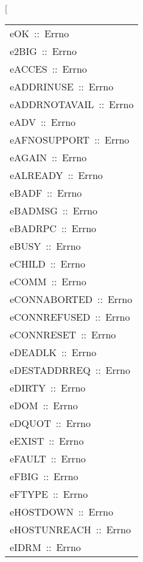\begin{haddockdesc}
\item[\begin{tabular}{@{}l}
eOK\ ::\ Errno\\e2BIG\ ::\ Errno\\eACCES\ ::\ Errno\\eADDRINUSE\ ::\ Errno\\eADDRNOTAVAIL\ ::\ Errno\\eADV\ ::\ Errno\\eAFNOSUPPORT\ ::\ Errno\\eAGAIN\ ::\ Errno\\eALREADY\ ::\ Errno\\eBADF\ ::\ Errno\\eBADMSG\ ::\ Errno\\eBADRPC\ ::\ Errno\\eBUSY\ ::\ Errno\\eCHILD\ ::\ Errno\\eCOMM\ ::\ Errno\\eCONNABORTED\ ::\ Errno\\eCONNREFUSED\ ::\ Errno\\eCONNRESET\ ::\ Errno\\eDEADLK\ ::\ Errno\\eDESTADDRREQ\ ::\ Errno\\eDIRTY\ ::\ Errno\\eDOM\ ::\ Errno\\eDQUOT\ ::\ Errno\\eEXIST\ ::\ Errno\\eFAULT\ ::\ Errno\\eFBIG\ ::\ Errno\\eFTYPE\ ::\ Errno\\eHOSTDOWN\ ::\ Errno\\eHOSTUNREACH\ ::\ Errno\\eIDRM\ ::\ Errno
\end{tabular}
\end{haddockdesc}
